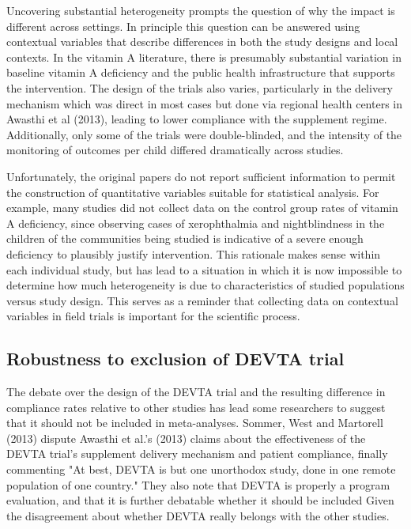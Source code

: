 \documentclass[12pt]{article}
\begin{document}
Uncovering substantial heterogeneity prompts the question of why the impact is different across settings. In principle this question can be answered using contextual variables that describe differences in both the study designs and local contexts. In the vitamin A literature, there is presumably substantial variation in baseline vitamin A deficiency and the public health infrastructure that supports the intervention. The design of the trials also varies, particularly in the delivery mechanism which was direct in most cases but done via regional health centers in Awasthi et al (2013), leading to lower compliance with the supplement regime. Additionally, only some of the trials were double-blinded, and the intensity of the monitoring of outcomes per child differed dramatically across studies. 

Unfortunately, the original papers do not report sufficient information to permit the construction of quantitative variables suitable for statistical analysis. For example, many studies did not collect data on the control group rates of vitamin A deficiency, since observing cases of xerophthalmia and nightblindness in the children of the communities being studied is indicative of a severe enough deficiency to plausibly justify intervention. This rationale makes sense within each individual study, but has lead to a situation in which it is now impossible to determine how much heterogeneity is due to characteristics of studied populations versus study design. This serves as a reminder that collecting data on contextual variables in field trials is important for the scientific process. 


\subsection{Robustness to exclusion of DEVTA trial}

The debate over the design of the DEVTA trial and the resulting difference in compliance rates relative to other studies has lead some researchers to suggest that it should not be included in meta-analyses. Sommer, West and Martorell (2013) dispute Awasthi et al.'s (2013) claims about the effectiveness of the DEVTA trial's supplement delivery mechanism and patient compliance, finally commenting "At best, DEVTA is but one unorthodox study, done in one remote population of one country." 
They also note that DEVTA is properly a program evaluation, and that it is further debatable whether it should be included Given the disagreement about whether DEVTA really belongs with the other studies. 
\end{document}
